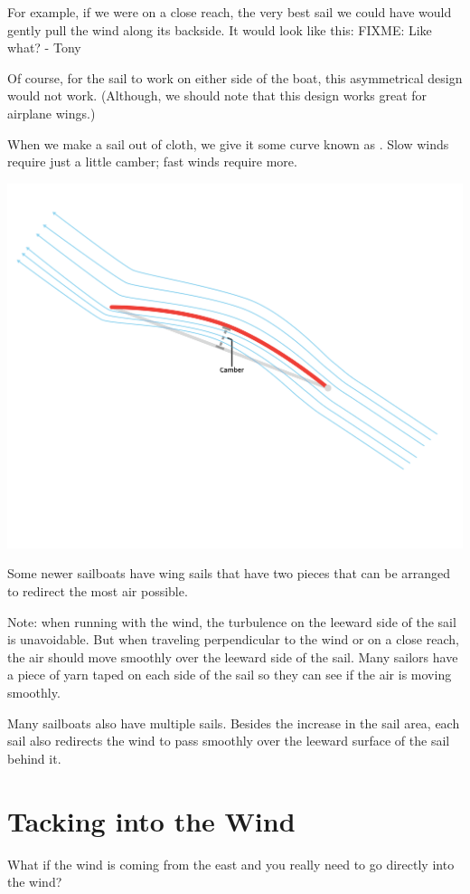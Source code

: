 For example, if we were on a close reach, the very best sail we could have would gently pull the wind along its backside.  It would look like this:
FIXME: Like what? - Tony

Of course, for the sail to work on either side of the boat,  this asymmetrical design would not work.  (Although,  we should note that this design works great
for airplane wings.)

When we make a sail out of cloth,  we give it some curve known as .  Slow winds require just a little camber;  fast winds require more.

\includegraphics[width=.75\textwidth]{camber.png}


Some newer sailboats have wing sails that have two pieces that can be arranged to redirect the most air possible.

Note: when running with the wind,  the turbulence on the leeward side of the sail is unavoidable.   But when traveling perpendicular to the wind or on a close reach,  the air should move smoothly over the leeward side of the sail.   Many sailors have a piece of yarn taped on each side of the sail so they can see if the air is moving smoothly.

Many sailboats also have multiple sails.  Besides the increase in the sail area,  each sail also redirects the wind to pass smoothly over the leeward surface of the sail
behind it.

\section{Tacking into the Wind}

What if the wind is coming from the east and you really need to go directly into the wind?  

